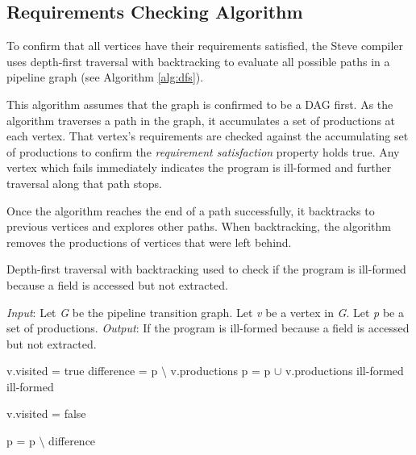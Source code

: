 \subsection{Requirements Checking Algorithm} \label{guide:dfs_desc}

To confirm that all vertices have their requirements satisfied, the Steve compiler uses depth-first traversal with backtracking to evaluate all possible paths in a pipeline graph (see Algorithm \ref{alg:dfs}).

This algorithm assumes that the graph is confirmed to be a DAG first.
As the algorithm traverses a path in the graph, it accumulates a set of productions at each vertex. That vertex's requirements are checked against the accumulating set of productions to confirm the \textit{requirement satisfaction} property holds true. Any vertex which fails immediately indicates the program is ill-formed and further traversal along that path stops.


Once the algorithm reaches the end of a path successfully, it backtracks to previous
vertices and explores other paths. When backtracking, the algorithm removes the productions of vertices that were left behind.

\begin{algorithm}[ht]
 \caption{Depth-first traversal with backtracking used to check if the program is ill-formed because a field is accessed but not extracted.}
 \label{alg:dfs}
 \begin{algorithmic}
 \State
 \State \textit{Input}: Let \textit{G} be the pipeline transition graph. Let \textit{v} be a vertex in \textit{G}. Let \textit{p} be a set of productions.
 \State \textit{Output}: If the program is ill-formed because a field is accessed but not extracted.
 \State

 	\State v.visited = true
 	\State difference = p $\setminus$ v.productions
 	\State p = p $\cup$ v.productions
 	 
 				\State {}
 			\Else
 				\State \Return ill-formed
 			\EndIf
 		\EndFor
	\Else
 		\State \Return ill-formed
 	\EndIf


 	\State v.visited = false 

 	\State p = p $\setminus$ difference 
 \EndFunction
 \end{algorithmic}

\end{algorithm}

